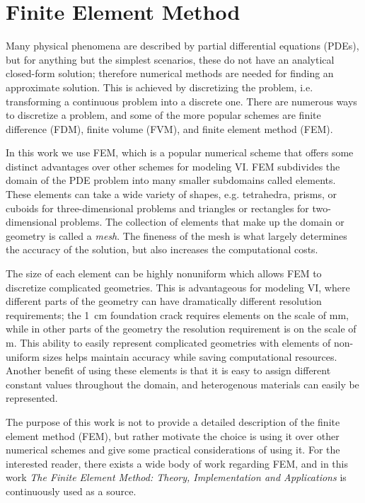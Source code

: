 \section{Finite Element Method}

Many physical phenomena are described by partial differential equations (PDEs), but for anything but the simplest scenarios, these do not have an analytical closed-form solution; therefore numerical methods are needed for finding an approximate solution.
This is achieved by discretizing the problem, i.e. transforming a continuous problem into a discrete one.
There are numerous ways to discretize a problem, and some of the more popular schemes are finite difference (FDM), finite volume (FVM), and finite element method (FEM).\par

In this work we use FEM, which is a popular numerical scheme that offers some distinct advantages over other schemes for modeling VI.
FEM subdivides the domain of the PDE problem into many smaller subdomains called elements.
These elements can take a wide variety of shapes, e.g. tetrahedra, prisms, or cuboids for three-dimensional problems and triangles or rectangles for two-dimensional problems.
The collection of elements that make up the domain or geometry is called a \textit{mesh}.
The fineness of the mesh is what largely determines the accuracy of the solution, but also increases the computational costs.\par

The size of each element can be highly nonuniform which allows FEM to discretize complicated geometries.
This is advantageous for modeling VI, where different parts of the geometry can have dramatically different resolution requirements; the \SI{1}{\centi\metre} foundation crack requires elements on the scale of \si{\milli\metre}, while in other parts of the geometry the resolution requirement is on the scale of \si{\metre}.
This ability to easily represent complicated geometries with elements of non-uniform sizes helps maintain accuracy while saving computational resources.
Another benefit of using these elements is that it is easy to assign different constant values throughout the domain, and heterogenous materials can easily be represented.\par

The purpose of this work is not to provide a detailed description of the finite element method (FEM), but rather motivate the choice is using it over other numerical schemes and give some practical considerations of using it.
For the interested reader, there exists a wide body of work regarding FEM, and in this work \textit{The Finite Element Method: Theory, Implementation and Applications}\cite{larson_finite_2010} is continuously used as a source.\par


